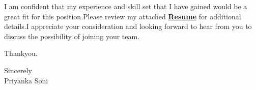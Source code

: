 \documentclass[11pt,a4]{article}
\begin{document}
I am confident that my experience and skill set that I have gained would be a great fit for this position.Please review my attached \href{https://drive.google.com/file/d/1kzRAjBxObR_zcMgENjn0aBw7xcJmGxGt/view}{\textbf{Resume}} for additional details.I appreciate your consideration and looking forward to hear from you to discuss the possibility of joining your team.\par

Thankyou.

\vspace{0.5cm}
\raggedright
Sincerely \\ Priyanka Soni
\end{document}
